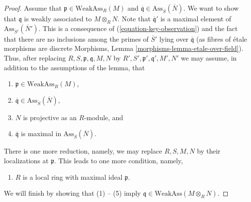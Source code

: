 \begin{proof}
\medskip\noindent
Assume that $\mathfrak p \in \text{WeakAss}_R(M)$ and
$\overline{\mathfrak q} \in \text{Ass}_{\overline{S}}(\overline{N})$.
We want to show that $\mathfrak q$ is weakly associated to $M \otimes_R N$.
Note that $\overline{\mathfrak q}'$ is a maximal element of
$\text{Ass}_{\overline{S}'}(\overline{N}')$.
This is a consequence of (\ref{equation-key-observation})
and the fact that there are no inclusions among the primes
of $\overline{S}'$ lying over $\overline{\mathfrak q}$
(as fibres of \'etale morphisms are discrete
Morphisms, Lemma \ref{morphisms-lemma-etale-over-field}).
Thus, after replacing $R, S, \mathfrak p, \mathfrak q, M, N$ by
$R', S', \mathfrak p', \mathfrak q', M', N'$
we may assume, in addition to the assumptions of the lemma, that
\begin{enumerate}
\item $\mathfrak p \in \text{WeakAss}_R(M)$,
\item $\overline{\mathfrak q} \in \text{Ass}_{\overline{S}}(\overline{N})$,
\item $N$ is projective as an $R$-module, and
\item $\overline{\mathfrak q}$ is maximal in
$\text{Ass}_{\overline{S}}(\overline{N})$.
\end{enumerate}
There is one more reduction, namely, we may replace
$R, S, M, N$ by their localizations at $\mathfrak p$.
This leads to one more condition, namely,
\begin{enumerate}
\item[(5)] $R$ is a local ring with maximal ideal $\mathfrak p$.
\end{enumerate}
We will finish by showing that (1) -- (5) imply
$\mathfrak q \in \text{WeakAss}(M \otimes_R N)$.


\end{proof}
